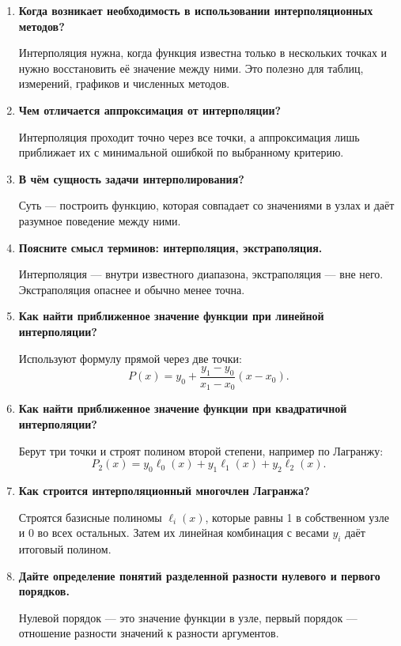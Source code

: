 \documentclass[12pt,a4paper]{article}
\begin{document}
\begin{enumerate}
\item \textbf{Когда возникает необходимость в использовании интерполяционных методов?}

Интерполяция нужна, когда функция известна только в нескольких точках и нужно восстановить её значение между ними. Это полезно для таблиц, измерений, графиков и численных методов.

\item \textbf{Чем отличается аппроксимация от интерполяции?}

Интерполяция проходит точно через все точки, а аппроксимация лишь приближает их с минимальной ошибкой по выбранному критерию.

\item \textbf{В чём сущность задачи интерполирования?}

Суть --- построить функцию, которая совпадает со значениями в узлах и даёт разумное поведение между ними.

\item \textbf{Поясните смысл терминов: интерполяция, экстраполяция.}

Интерполяция --- внутри известного диапазона, экстраполяция --- вне него. Экстраполяция опаснее и обычно менее точна.

\item \textbf{Как найти приближенное значение функции при линейной интерполяции?}

Используют формулу прямой через две точки:
\[
P(x)=y_0+\frac{y_1-y_0}{x_1-x_0}(x-x_0).
\]

\item \textbf{Как найти приближенное значение функции при квадратичной интерполяции?}

Берут три точки и строят полином второй степени, например по Лагранжу:
\[
P_2(x)=y_0\ell_0(x)+y_1\ell_1(x)+y_2\ell_2(x).
\]

\item \textbf{Как строится интерполяционный многочлен Лагранжа?}

Строятся базисные полиномы $\ell_i(x)$, которые равны 1 в собственном узле и 0 во всех остальных. Затем их линейная комбинация с весами $y_i$ даёт итоговый полином.

\item \textbf{Дайте определение понятий разделенной разности нулевого и первого порядков.}

Нулевой порядок --- это значение функции в узле, первый порядок --- отношение разности значений к разности аргументов.


\end{enumerate}
\end{document}
